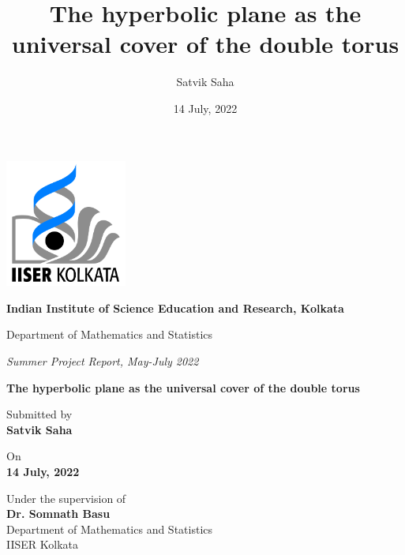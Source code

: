 \documentclass[12pt]{article}
\title{
    The hyperbolic plane as the universal cover of the double torus
}
\author{Satvik Saha}
\date{14 July, 2022}
\theoremstyle{definition}
\theoremstyle{remark}
\begin{document}
    \begin{center}
    \vspace*{\fill}
    \thispagestyle{empty}
        \includegraphics[width=4cm]{iiserk_logo.png}

        \vspace{0.5cm}

        {
            \Large\bfseries
            Indian Institute of Science Education and Research, Kolkata\par
        }

        \vspace{0.2cm}

        {
            \large
            Department of Mathematics and Statistics
        }

        \vspace{0.1cm}

        {
            \large\it
            Summer Project Report, May-July 2022
        }

        \vspace{1cm}

        {
            \LARGE\bfseries
            The hyperbolic plane as the universal cover of the double torus\par
        }

        \vspace{1cm}

        Submitted by\\
        \vspace{0.2cm}
        {
            \Large\bfseries
            Satvik Saha
        }

        \vspace{0.8cm}

        On\\
        \vspace{0.2cm}
        {
            \Large\bfseries
            14 July, 2022
        }

        \vspace{0.8cm}

        Under the supervision of\\
        \vspace{0.2cm}
        {
            \Large\bfseries
            Dr. Somnath Basu\\
        }
        \vspace{0.2cm}
        {
            \large
            Department of Mathematics and Statistics\\
            IISER Kolkata
        }
    \vspace*{\fill}
    \end{center}
\end{document}
